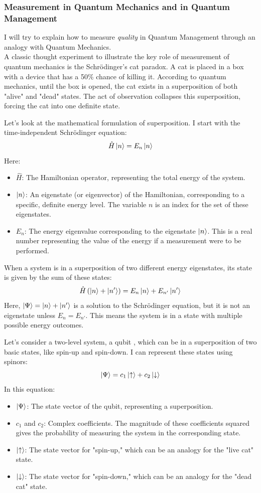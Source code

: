 \documentclass{article}
\begin{document}
 \subsubsection{Measurement in Quantum Mechanics and in Quantum Management}
 I will try to explain how to measure \textit{quality} in Quantum Management through an analogy with Quantum Mechanics.\\
 A classic thought experiment to illustrate the key role of measurement of quantum mechanics is the Schrödinger's cat paradox. A cat is placed in a box with a device that has a 50\% chance of killing it. According to quantum mechanics, until the box is opened, the cat exists in a superposition of both "alive" and "dead" states. The act of observation collapses this superposition, forcing the cat into one definite state. 
 
 Let's look at the mathematical formulation of superposition. I start with the time-independent Schrödinger equation:
 $$ \hat{H} \ket{n} = E_n \ket{n} $$
 Here:
 \begin{itemize}
 	\item $\hat{H}$: The Hamiltonian operator, representing the total energy of the system.
 	\item $\ket{n}$: An eigenstate (or eigenvector) of the Hamiltonian, corresponding to a specific, definite energy level. The variable $n$ is an index for the set of these eigenstates.
 	\item $E_n$: The energy eigenvalue corresponding to the eigenstate $\ket{n}$. This is a real number representing the value of the energy if a measurement were to be performed.
 \end{itemize}
 
 When a system is in a superposition of two different energy eigenstates, its state is given by the sum of these states:
 $$ \hat{H} \left(\ket{n} + \ket{n'}\right) = E_n \ket{n} + E_{n'} \ket{n'} $$
 Here, $\ket{\Psi} = \ket{n} + \ket{n'}$ is a solution to the Schrödinger equation, but it is not an eigenstate unless $E_n = E_{n'}$. This means the system is in a state with multiple possible energy outcomes.
 
 Let's consider a two-level system, a   qubit  , which can be in a superposition of two basic states, like spin-up and spin-down. I can represent these states using spinors:
 $$ \ket{\Psi} = c_1 \ket{\uparrow} + c_2 \ket{\downarrow} $$
 In this equation:
 \begin{itemize}
 	\item $\ket{\Psi}$: The state vector of the qubit, representing a superposition.
 	\item $c_1$ and $c_2$: Complex coefficients. The magnitude of these coefficients squared gives the probability of measuring the system in the corresponding state.
 	\item $\ket{\uparrow}$: The state vector for "spin-up," which can be an analogy for the "live cat" state.
 	\item $\ket{\downarrow}$: The state vector for "spin-down," which can be an analogy for the "dead cat" state.
 \end{itemize}
 
\end{document}
